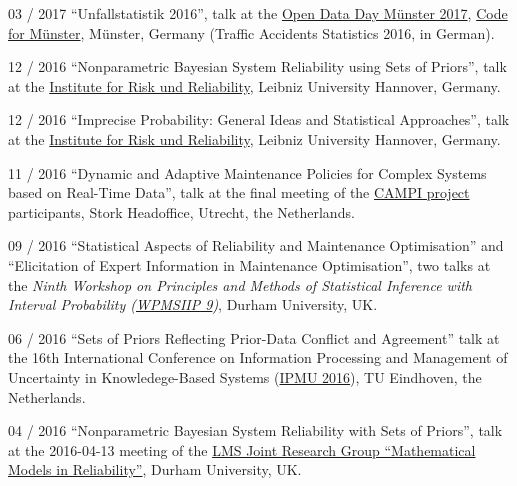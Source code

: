 \documentclass[a4paper]{simplecv}
\begin{document}
\begin{topic}
\item[03 / 2017] ``Unfallstatistik 2016'', talk at the %
                 \href{http://codeformuenster.org/opendataday/}{Open Data Day Münster 2017}, \href{http://codeformuenster.org/}{Code for Münster}, Münster, Germany
                 (Traffic Accidents Statistics 2016, in German).
\item[12 / 2016] ``Nonparametric Bayesian System Reliability using Sets of Priors'', talk at the %
                 \href{http://www.irz.uni-hannover.de/}{Institute for Risk und Reliability}, Leibniz University Hannover, Germany.
\item[12 / 2016] ``Imprecise Probability: General Ideas and Statistical Approaches'', talk at the %
                 \href{http://www.irz.uni-hannover.de/}{Institute for Risk und Reliability}, Leibniz University Hannover, Germany.
\item[11 / 2016] ``Dynamic and Adaptive Maintenance Policies for Complex Systems based on Real-Time Data'', talk at the %
                 final meeting of the \href{http://www.dinalog.nl/en/project/campi/}{CAMPI project} participants,
                 Stork Headoffice, Utrecht, the Netherlands.
\item[09 / 2016] ``Statistical Aspects of Reliability and Maintenance Optimisation'' and
                 ``Elicitation of Expert Information in Maintenance Optimisation'', two talks at the %
                 \emph{Ninth Workshop on Principles and Methods of Statistical Inference with Interval Probability (\href{http://www.maths.dur.ac.uk/users/matthias.troffaes/wpmsiip2016/index.html}{WPMSIIP 9})}, Durham University, UK.

\item[06 / 2016] ``Sets of Priors Reflecting Prior-Data Conflict and Agreement'' talk at %
                 the 16th International Conference on Information Processing and Management of Uncertainty in Knowledege-Based Systems
                 (\href{http://ipmu2016.org/}{IPMU 2016}), TU Eindhoven, the Netherlands.

\item[04 / 2016] ``Nonparametric Bayesian System Reliability with Sets of Priors'', talk at the %
                 2016-04-13 meeting of the \href{http://maths.dur.ac.uk/stats/people/fc/LMS-Reliability.html}{LMS Joint Research Group ``Mathematical Models in Reliability''}, Durham University, UK.


\end{topic}
\end{document}
